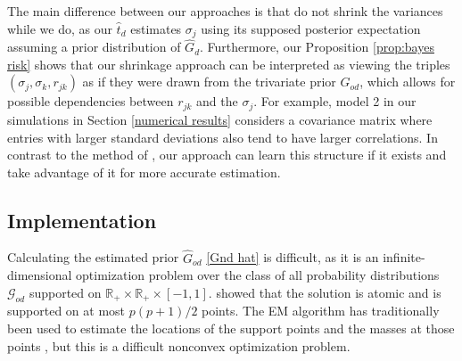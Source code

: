 \documentclass[useAMS,referee,usenatbib]{biom}
\begin{document}
The main difference between our approaches is that \citet{dey2018corshrink} do not shrink the variances while we do, as our $\hat{t}_d$ estimates $\sigma_j$ using its supposed posterior expectation assuming a prior distribution of $\hat{G}_d$. Furthermore, our Proposition \ref{prop:bayes risk} shows that our shrinkage approach can be interpreted as viewing the triples $(\sigma_j, \sigma_k, r_{jk})$ as if they were drawn from the trivariate prior $G_{od}$, which allows for possible dependencies between $r_{jk}$ and the $\sigma_j$. For example, model 2 in our simulations in Section \ref{numerical results} considers a covariance matrix where entries with larger standard deviations also tend to have larger correlations. In contrast to the method of \citet{dey2018corshrink}, our approach can learn this structure if it exists and take advantage of it for more accurate estimation.

\subsection{\label{implementation}Implementation}

Calculating the estimated prior $\hat{G}_{od}$ \eqref{Gnd hat} is difficult, as it is an infinite-dimensional optimization problem over the class of all probability distributions $\mathcal{G}_{od}$ supported on $\mathbb{R}_+ \times \mathbb{R}_+ \times [-1, 1]$. \citet{lindsay1983geometry} showed that the solution is atomic and is supported on at most $p(p+1)/2$ points. The EM algorithm has traditionally been used to estimate the locations of the support points and the masses at those points \citep{laird1978nonparametric}, but this is a difficult nonconvex optimization problem.
\end{document}

